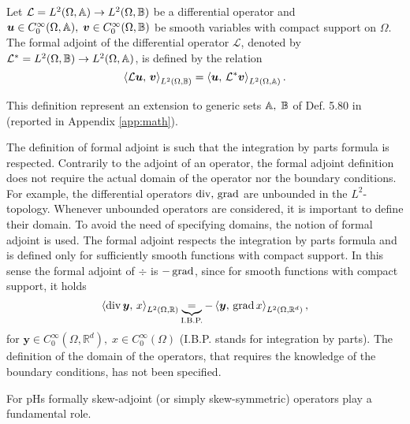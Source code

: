 \begin{definition}
Let $\mathcal{L}= L^2(\Omega, \bbA) \rightarrow L^2(\Omega, \bbB)$ be a differential operator and  $\bm{u} \in C_0^\infty(\Omega, \bbA), \; \bm{v} \in C_0^\infty(\Omega, \bbB)$ be smooth variables with compact support on $\Omega$. The formal adjoint of the differential operator $\mathcal{L}$, denoted by $\mathcal{L}^*= L^2(\Omega, \bbB) \rightarrow L^2(\Omega, \bbA)$, is defined by the relation
\begin{equation}
\inner[L^2(\Omega, \bbB)]{\mathcal{L}\bm{u}}{\bm{v}} = \inner[L^2(\Omega, \bbA)]{\bm{u}}{\mathcal{L}^*\bm{v}}.
\end{equation}{}
\end{definition}
This definition represent an extension to generic sets $\bbA, \; \bbB$ of Def. 5.80 in \cite{rogers2004pde} (reported in Appendix \ref{app:math}). 

\begin{remark}
	The definition of formal adjoint is such that the integration by parts formula is respected. Contrarily to the adjoint of an operator, the formal adjoint definition does not require the actual domain of the operator nor the boundary conditions. For example, the differential operators $\div,\, \grad$ are unbounded in the ${L}^2$-topology. Whenever unbounded operators are considered, it is important to define their domain. To avoid the need of specifying domains, the notion of formal adjoint is used. The formal adjoint respects the integration by parts formula and is defined only for sufficiently smooth functions with compact support. In this sense the formal adjoint of $\div$  is $-\grad$, since for smooth functions with compact support, it holds
	\begin{equation*}
	\inner[{L}^2(\Omega, \mathbb{R})]{\div \bm{y}}{x}
	\underbrace{=}_{\text{I.B.P.}} -\inner[{L}^2(\Omega, \mathbb{R}^{d})]{\bm{y}}{\grad {x}},
	\end{equation*}
	for $\bm{y} \in C_0^\infty(\Omega, \mathbb{R}^{d}), \; {x} \in C_0^\infty(\Omega)$ (I.B.P. stands for integration by parts). The definition of the domain of the operators, that requires the knowledge of the boundary conditions, has not been specified. 
\end{remark}

For pHs formally skew-adjoint (or simply skew-symmetric) operators  play a fundamental role.

